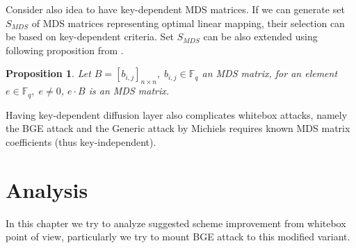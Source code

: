 \documentclass[11pt,oneside,final]{fithesis2}
\newtheorem{myprop}{Proposition}
\begin{document}
    \begin{figure}
    \begin{center}
    \leavevmode
    \centerline{}
    \end{center}
    \caption{}
    \label{fig:aes_mds}
    \end{figure}
    
    Consider also idea to have key-dependent MDS matrices. If we can generate set $S_{MDS}$ of MDS matrices representing optimal linear mapping, their selection 
    can be based on key-dependent criteria. Set $S_{MDS}$ can be also extended using following proposition from \citep{journals/iacr/MalikN11}.

    \begin{myprop}
	Let $B = \left[b_{i,j} \right]_{n \times n},\; b_{i,j} \in \mathbb{F}_q$ an MDS matrix, for an element $e \in \mathbb{F}_q, \; e \neq 0$, $e \cdot B$ is an MDS matrix.
    \end{myprop}
    
    Having key-dependent diffusion layer also complicates whitebox attacks, namely the BGE attack \citep{Billet:2004:CWB:2080787.2080809} and 
    the Generic attack by Michiels \citep{Michiels:2007:MST:1314276.1314291} requires known MDS matrix coefficients (thus key-independent).    
    
    \section{Analysis}\label{sec:improvement_analysis}
    In this chapter we try to analyze suggested scheme improvement from whitebox point of view, particularly we try to mount BGE attack to this modified variant. 
\end{document}
